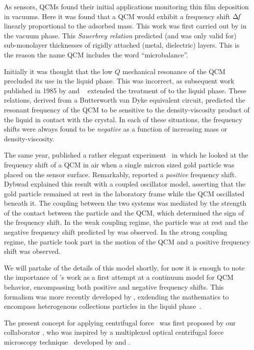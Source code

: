 As sensors, QCMs found their initial applications monitoring thin film
deposition in vacuums.  Here it was found that a QCM would exhibit a
frequency shift $\Delta\!f$ linearly proportional to the adsorbed mass.  This
work was first carried out by  in the vacuum phase.  This
\textit{Sauerbrey relation} predicted (and was only valid for) sub-monolayer
thicknesses of rigidly attached (metal, dielectric) layers.  This is the
reason the name QCM includes the word ``microbalance''.

Initially it was thought that the low $Q$ mechanical resonance of the QCM
precluded its use in the liquid phase.  This was incorrect, as subsequent
work published in 1985 by  and
~\cite{kanazawa1985frequency} extended the treatment of
 to the liquid phase.  These relations, derived from a
Butterworth van Dyke equivalent circuit, predicted the resonant frequency
of the QCM to be sensitive to the density-viscosity product of the liquid
in contact with the crystal.  In each of these situations, the frequency
shifts were always found to be \textit{negative} as a function of
increasing mass or density-viscosity.

The same year,  published a rather elegant
experiment~\cite{dybwad1985sensitive} in which he looked at the frequency
shift of a QCM in air when a single micron sized gold particle was placed
on the sensor surface.  Remarkably,  reported a
\textit{positive} frequency shift.  Dybwad explained this result with a
coupled oscillator model, asserting that the gold particle remained at rest
in the laboratory frame while the QCM oscillated beneath it.  The coupling
between the two systems was mediated by the strength of the contact between
the particle and the QCM, which determined the sign of the frequency shift.
In the weak coupling regime, the particle was at rest and the negative
frequency shift predicted by  was observed.  In the strong
coupling regime, the particle took part in the motion of the QCM and a
positive frequency shift was observed.

We will partake of the details of this model shortly, for now it is enough
to note the importance of 's work as a first attempt at a
continuum model for QCM behavior, encompassing both positive and negative
frequency shifts.  This formalism was more recently developed by 
, exdending the mathematics to encompass heterogenous
collections particles in the liquid phase~\cite{johannsman2007contacts}.

The present concept for applying centrifugal force~\cite{webster2013qcm}
was first proposed by our collaborator , who was inspired by a
multiplexed optical centrifugal force microscopy
technique~\cite{halvorsen2010massively} developed by  and
.  
